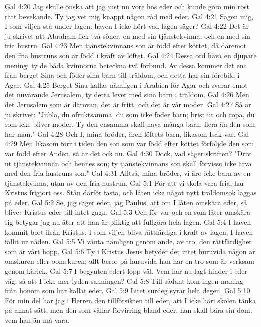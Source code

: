 Gal 4:20  Jag skulle önska att jag just nu vore hos eder och kunde göra min röst rätt bevekande. Ty jag vet mig knappt någon råd med eder.
Gal 4:21  Sägen mig, I som viljen stå under lagen: haven I icke hört vad lagen säger?
Gal 4:22  Det är ju skrivet att Abraham fick två söner, en med sin tjänstekvinna, och en med sin fria hustru.
Gal 4:23  Men tjänstekvinnans son är född efter köttet, då däremot den fria hustruns son är född i kraft av löftet.
Gal 4:24  Dessa ord hava en djupare mening; ty de båda kvinnorna beteckna två förbund. Av dessa kommer det ena från berget Sina och föder sina barn till träldom, och detta har sin förebild i Agar.
Gal 4:25  Berget Sina kallas nämligen i Arabien för Agar och svarar emot det nuvarande Jerusalem, ty detta lever med sina barn i träldom.
Gal 4:26  Men det Jerusalem som är därovan, det är fritt, och det är vår moder.
Gal 4:27  Så är ju skrivet: "Jubla, du ofruktsamma, du som icke föder barn; brist ut och ropa, du som icke bliver moder, Ty den ensamma skall hava många barn, flera än den som har man."
Gal 4:28  Och I, mina bröder, ären löftets barn, likasom Isak var.
Gal 4:29  Men likasom förr i tiden den son som var född efter köttet förföljde den som var född efter Anden, så är det ock nu.
Gal 4:30  Dock, vad säger skriften? "Driv ut tjänstekvinnan och hennes son; ty tjänstekvinnans son skall förvisso icke ärva med den fria hustruns son."
Gal 4:31  Alltså, mina bröder, vi äro icke barn av en tjänstekvinna, utan av den fria hustrun.
Gal 5:1  För att vi skola vara fria, har Kristus frigjort oss. Stån därför fasta, och låten icke något nytt träldomsok läggas på eder.
Gal 5:2  Se, jag säger eder, jag Paulus, att om I låten omskära eder, så bliver Kristus eder till intet gagn.
Gal 5:3  Och för var och en som låter omskära sig betygar jag nu åter att han är pliktig att fullgöra hela lagen.
Gal 5:4  I haven kommit bort ifrån Kristus, I som viljen bliva rättfärdiga i kraft av lagen; I haven fallit ur nåden.
Gal 5:5  Vi vänta nämligen genom ande, av tro, den rättfärdighet som är vårt hopp.
Gal 5:6  Ty i Kristus Jesus betyder det intet huruvida någon är omskuren eller oomskuren; allt beror på huruvida han har en tro som är verksam genom kärlek.
Gal 5:7  I begynten edert lopp väl. Vem har nu lagt hinder i eder väg, så att I icke mer lyden sanningen?
Gal 5:8  Till sådant kom ingen maning från honom som har kallat eder.
Gal 5:9  Litet surdeg syrar hela degen.
Gal 5:10  För min del har jag i Herren den tillförsikten till eder, att I icke häri skolen tänka på annat sätt; men den som vållar förvirring bland eder, han skall bära sin dom, vem han än må vara.
